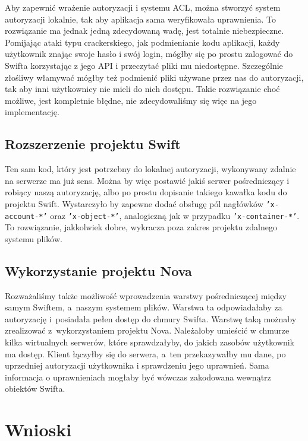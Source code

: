 	Aby zapewnić wrażenie autoryzacji i systemu ACL, można stworzyć system autoryzacji lokalnie, tak aby aplikacja sama weryfikowała uprawnienia. To rozwiązanie ma jednak jedną zdecydowaną wadę, jest totalnie niebezpieczne. Pomijając ataki typu crackerskiego, jak podmienianie kodu aplikacji, każdy użytkownik znając swoje hasło i swój login, mógłby się po prostu zalogować do Swifta korzystając z jego API i przeczytać pliki mu niedostępne. Szczególnie złośliwy włamywać mógłby też podmienić pliki używane przez nas do autoryzacji, tak aby inni użytkownicy nie mieli do nich dostępu. Takie rozwiązanie choć możliwe, jest kompletnie błędne, nie zdecydowaliśmy się więc na jego implementację.

	\subsection{Rozszerzenie projektu Swift}\label{sub:rozszerzenie projektu swift}

	Ten sam kod, który jest potrzebny do lokalnej autoryzacji, wykonywany zdalnie na serwerze ma już sens. Można by więc postawić jakiś serwer pośredniczący i robiący naszą autoryzację, albo po prostu dopisanie takiego kawałka kodu do projektu Swift. Wystarczyło by zapewne dodać obsługę pól nagłówków \texttt{'x-account-*'} oraz \texttt{'x-object-*'}, analogiczną jak w przypadku \texttt{'x-container-*'}. To rozwiązanie, jakkolwiek dobre, wykracza poza zakres projektu zdalnego systemu plików.
	
	\subsection{Wykorzystanie projektu Nova}\label{sub:wykorzystanie projektu nova}

    Rozważaliśmy także możliwość wprowadzenia warstwy pośredniczącej między samym Swiftem, a~naszym systemem plików. Warstwa ta odpowiadałaby za autoryzację i~posiadała pełen dostęp do chmury Swifta. Warstwę taką możnaby zrealizować z~wykorzystaniem projektu Nova. Należałoby umieścić w chmurze kilka wirtualnych serwerów, które sprawdzałyby, do jakich zasobów użytkownik ma dostęp. Klient łączyłby się do serwera, a~ten przekazywałby mu dane, po uprzedniej autoryzacji użytkownika i sprawdzeniu jego uprawnień. Sama informacja o uprawnieniach mogłaby być wówczas zakodowana wewnątrz obiektów Swifta.
	
	\section{Wnioski}\label{sec:wnioski}

